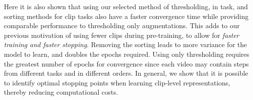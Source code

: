 Here it is also shown that using our selected method of thresholding, in task, and sorting methods for clip tasks also have a faster convergence time while providing comparable performance to thresholding only augmentations. This adds to our previous motivation of using fewer clips during pre-training, to allow for \emph{faster training and faster stopping}. Removing the sorting leads to more variance for the model to learn, and doubles the epochs required. Using only thresholding requires the greatest number of epochs for convergence since each video may contain steps from different tasks and in different orders. In general, we show that it is possible to identify optimal stopping points when learning clip-level representations, thereby reducing computational costs. 

